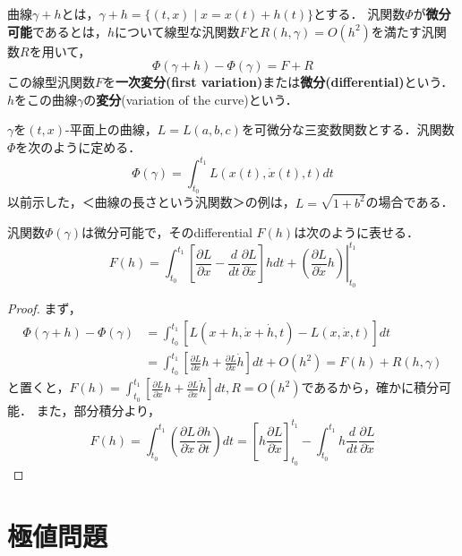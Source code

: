 \documentclass[uplatex, dvipdfmx]{jsreport}
\begin{document}
\begin{definition}
    曲線$\gamma+h$とは，$\gamma+h=\{(t,x)\mid x=x(t)+h(t)\}$とする．
    汎関数$\Phi$が\textbf{微分可能}であるとは，$h$について線型な汎関数$F$と$R(h,\gamma)=O(h^2)$を満たす汎関数$R$を用いて，
    \[ \Phi(\gamma+h)-\Phi(\gamma) = F+R \]
    この線型汎関数$F$を\textbf{一次変分(first variation)}または\textbf{微分(differential)}という．$h$をこの曲線$\gamma$の\textbf{変分}(variation of the curve)という．
\end{definition}
\begin{example}
    $\gamma$を$(t,x)$-平面上の曲線，$L=L(a,b,c)$を可微分な三変数関数とする．汎関数$\Phi$を次のように定める．
    \[ \Phi(\gamma) = \int^{t_1}_{t_0}L(x(t),\dot{x}(t),t)dt \]
    以前示した，＜曲線の長さという汎関数＞の例は，$L=\sqrt{1+b^2}$の場合である．
\end{example}

\begin{theorem}\label{thm-differential-of-action-functional}
    汎関数$\Phi(\gamma)$は微分可能で，そのdifferential $F(h)$は次のように表せる．
    \[ F(h) = \int^{t_1}_{t_0}\left.\left[ \frac{\partial L}{\partial x}-\frac{d}{dt}\frac{\partial L}{\partial\dot{x}} \right]hdt+\left(\frac{\partial L}{\partial\dot{x}}h\right) \right|^{t_1}_{t_0} \]
\end{theorem}
\begin{proof}
    まず，
    \begin{align*}
        \Phi(\gamma+h)-\Phi(\gamma) &= \int^{t_1}_{t_0}\left[L(x+h,\dot{x}+\dot{h},t)-L(x,\dot{x},t)\right]dt\\
        &= \int^{t_1}_{t_0}\left[\frac{\partial L}{\partial x}h+\frac{\partial L}{\partial\dot{x}}\dot{h}\right]dt + O(h^2) = F(h) + R(h,\gamma)
    \end{align*}
    と置くと，$F(h)=\int^{t_1}_{t_0}\left[\frac{\partial L}{\partial x}h+\frac{\partial L}{\partial\dot{x}}\dot{h}\right]dt, R=O(h^2)$であるから，確かに積分可能．
    また，部分積分より，
    \[ F(h) = \int^{t_1}_{t_0}\left( \frac{\partial L}{\partial\dot{x}}\frac{\partial h}{\partial t} \right)dt = \left[ h\frac{\partial L}{\partial\dot{x}} \right]^{t_1}_{t_0} - \int^{t_1}_{t_0} h\frac{d}{dt}\frac{\partial L}{\partial\dot{x}} \]
\end{proof}

\section{極値問題}
\end{document}
